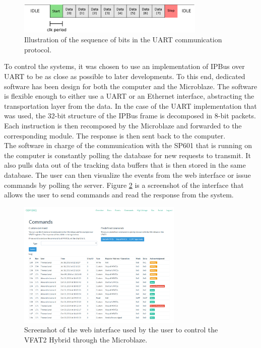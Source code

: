       \begin{figure}[h!]
        \centering
        \includegraphics[width=0.8\textwidth]{img/III-1-arch/uart.png}
        \caption{Illustration of the sequence of bits in the UART communication protocol.}
        \label{fig:III-1-uart}
      \end{figure}

      To control the systems, it was chosen to use an implementation of IPBus over UART to be as close as possible to later developments. To this end, dedicated software has been design for both the computer and the Microblaze. The software is flexible enough to either use a UART or an Ethernet interface, abstracting the transportation layer from the data. In the case of the UART implementation that was used, the 32-bit structure of the IPBus frame is decomposed in 8-bit packets. Each instruction is then recomposed by the Microblaze and forwarded to the corresponding module. The response is then sent back to the computer. \\

      The software in charge of the communication with the SP601 that is running on the computer is constantly polling the database for new requests to transmit. It also pulls data out of the tracking data buffers that is then stored in the same database. The user can then visualize the events from the web interface or issue commands by polling the server. Figure \ref{fig:III-1-app-cmd} is a screenshot of the interface that allows the user to send commands and read the response from the system.

      \begin{figure}[h!]
        \centering
        \includegraphics[width=0.7\textwidth]{img/III-1-arch/app-cmd.png}
        \caption{Screenshot of the web interface used by the user to control the VFAT2 Hybrid through the Microblaze.}
        \label{fig:III-1-app-cmd}
      \end{figure}

